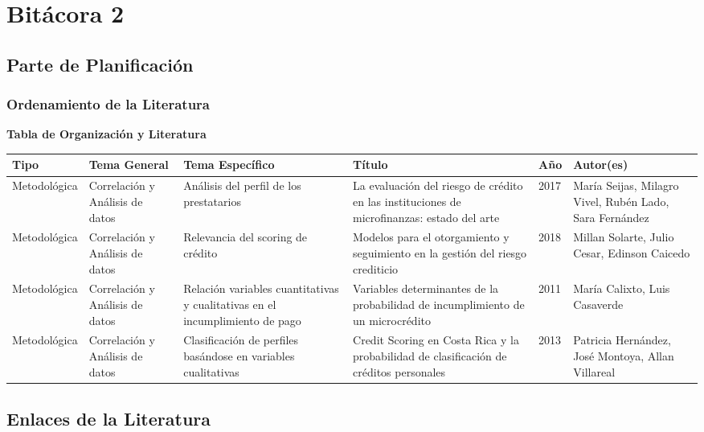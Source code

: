 \documentclass[
  letterpaper,
  DIV=11,
  numbers=noendperiod]{scrreprt}
\begin{document}
\chapter{Bitácora 2}\label{bituxe1cora-2}

\section{Parte de Planificación}\label{parte-de-planificaciuxf3n-1}

\subsection{Ordenamiento de la
Literatura}\label{ordenamiento-de-la-literatura}

\textbf{Tabla de Organización y Literatura}

\begin{longtable*}{| p{2.5cm} | p{2cm} | p{2.5cm} | p{3cm} | p{0.8cm} | p{2.5cm} |}
\hline
\textbf{Tipo} & \textbf{Tema General} & \textbf{Tema Específico} & \textbf{Título} & \textbf{Año} & \textbf{Autor(es)} \\
\hline
\fontsize{8pt}{10pt}
Metodológica & Correlación y Análisis de datos & Análisis del perfil de los prestatarios & La evaluación del riesgo de crédito en las instituciones de microfinanzas: estado del arte & 2017 & María Seijas, Milagro Vivel, Rubén Lado, Sara Fernández \\
\hline
Metodológica & Correlación y Análisis de datos & Relevancia del scoring de crédito & Modelos para el otorgamiento y seguimiento en la gestión del riesgo crediticio & 2018 & Millan Solarte, Julio Cesar, Edinson Caicedo \\
\hline
Metodológica & Correlación y Análisis de datos & Relación variables cuantitativas y cualitativas en el incumplimiento de pago & Variables determinantes de la probabilidad de incumplimiento de un microcrédito & 2011 & María Calixto, Luis Casaverde \\
\hline
Metodológica & Correlación y Análisis de datos & Clasificación de perfiles basándose en variables cualitativas & Credit Scoring en Costa Rica y la probabilidad de clasificación de créditos personales & 2013 & Patricia Hernández, José Montoya, Allan Villareal \\
\hline
\end{longtable*}

\normalsize
\newpage

\section{Enlaces de la Literatura}\label{enlaces-de-la-literatura}
\end{document}
